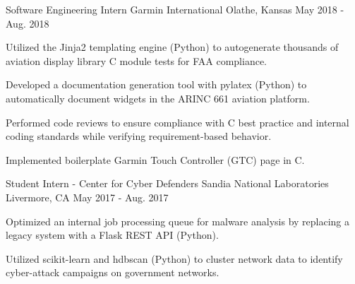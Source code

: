 

\begin{cventries}


\cventry
  {Software Engineering Intern} %
  {Garmin International} %
  {Olathe, Kansas} %
  {May 2018 - Aug. 2018} %
  {
    \begin{cvitems} %
      \item {Utilized the Jinja2 templating engine (Python) to autogenerate
        thousands of aviation display library C module tests for FAA
        compliance.}
      \item {Developed a documentation generation tool with pylatex (Python) to
        automatically document widgets in the ARINC 661 aviation platform.}
      \item {Performed code reviews to ensure compliance with C best practice
        and internal coding standards while verifying requirement-based behavior.}
      \item {Implemented boilerplate Garmin Touch Controller (GTC) page in C.}
    \end{cvitems}
  }


\cventry
  {Student Intern - Center for Cyber Defenders} %
  {Sandia National Laboratories} %
  {Livermore, CA} %
  {May 2017 - Aug. 2017} %
  {
    \begin{cvitems} %
      \item {Optimized an internal job processing queue for malware analysis by
        replacing a legacy system with a Flask REST API (Python).}
      \item {Utilized scikit-learn and hdbscan (Python) to cluster network data
        to identify cyber-attack campaigns on government networks.}
    \end{cvitems}
  }



\end{cventries}
